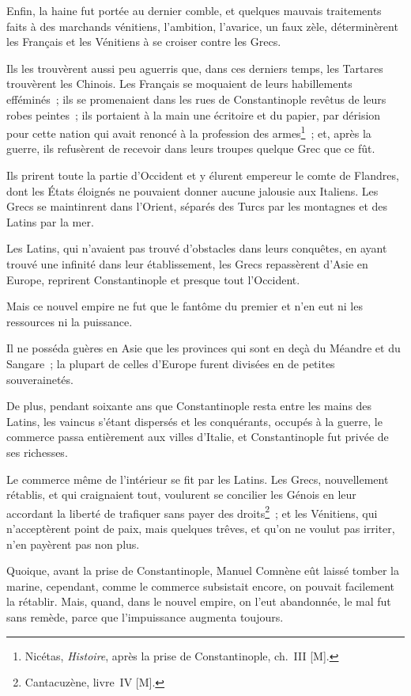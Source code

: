 \documentclass[french,twoside]{book} %
\begin{document}
Enfin, la haine fut portée au dernier comble, et quelques mauvais traitements faits à des marchands vénitiens, l’ambition, l’avarice, un faux zèle, déterminèrent les Français et les Vénitiens à se croiser contre les Grecs.\par
Ils les trouvèrent aussi peu aguerris que, dans ces derniers temps, les Tartares trouvèrent les Chinois. Les Français se moquaient de leurs habillements efféminés ; ils se promenaient dans les rues de Constantinople revêtus de leurs robes peintes ; ils portaient à la main une écritoire et du papier, par dérision pour cette nation qui avait renoncé à la profession des armes\footnote{Nicétas, {\itshape Histoire}, après la prise de Constantinople, ch. III [M].} ; et, après la guerre, ils refusèrent de recevoir dans leurs troupes quelque Grec que ce fût.\par
Ils prirent toute la partie d’Occident et y élurent empereur le comte de Flandres, dont les États éloignés ne pouvaient donner aucune jalousie aux Italiens. Les Grecs se maintinrent dans l’Orient, séparés des Turcs par les montagnes et des Latins par la mer.\par
Les Latins, qui n’avaient pas trouvé d’obstacles dans leurs conquêtes, en ayant trouvé une infinité dans leur établissement, les Grecs repassèrent d’Asie en Europe, reprirent Constantinople et presque tout l’Occident.\par
Mais ce nouvel empire ne fut que le fantôme du premier et n’en eut ni les ressources ni la puissance.\par
Il ne posséda guères en Asie que les provinces qui sont en deçà du Méandre et du Sangare ; la plupart de celles d’Europe furent divisées en de petites souverainetés.\par
De plus, pendant soixante ans que Constantinople resta entre les mains des Latins, les vaincus s’étant dispersés et les conquérants, occupés à la guerre, le commerce passa entièrement aux villes d’Italie, et Constantinople fut privée de ses richesses.\par
Le commerce même de l’intérieur se fit par les Latins. Les Grecs, nouvellement rétablis, et qui craignaient tout, voulurent se concilier les Génois en leur accordant la liberté de trafiquer sans payer des droits\footnote{Cantacuzène, livre IV [M].} ; et les Vénitiens, qui n’acceptèrent point de paix, mais quelques trêves, et qu’on ne voulut pas irriter, n’en payèrent pas non plus.\par
Quoique, avant la prise de Constantinople, Manuel Comnène eût laissé tomber la marine, cependant, comme le commerce subsistait encore, on pouvait facilement la rétablir. Mais, quand, dans le nouvel empire, on l’eut abandonnée, le mal fut sans remède, parce que l’impuissance augmenta toujours.\par
\end{document}
